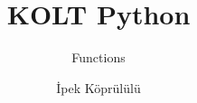 
\usepackage{../KU-Beamer-Template/style/koc} 
\usepackage{minted}
\usepackage{upquote}
\usepackage{graphicx}

\title{KOLT Python}
\subtitle{Functions} 
\date{}
\author{İpek Köprülülü}




    \maketitle


